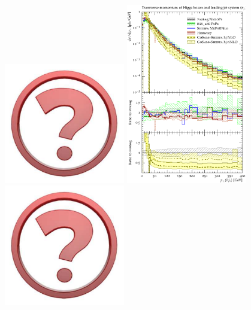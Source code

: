 \begin{figure}[t!]
  \centering
  \includegraphics[width=0.47\textwidth]{Micon.pdf}
  \hfill
  \includegraphics[width=0.47\textwidth]{figures/hjetscomp_Hj_pT_incl.pdf}
  \\[2mm]
  \includegraphics[width=0.47\textwidth]{Micon.pdf}

\end{figure}
